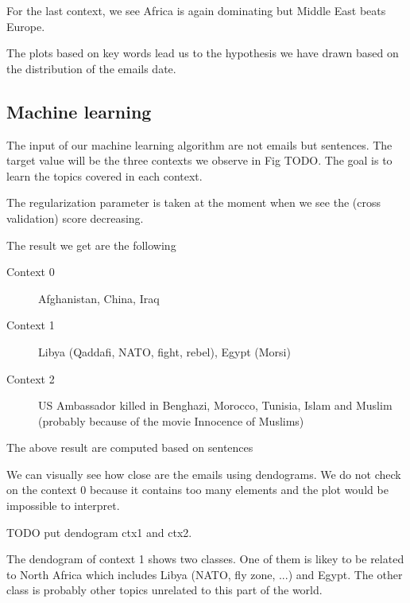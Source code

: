 \documentclass[11pt]{article}
\begin{document}
For the last context, we see Africa is again dominating but Middle East beats Europe.

The plots based on key words lead us to the hypothesis we have drawn based on the distribution of the emails date.

\subsection{Machine learning}

The input of our machine learning algorithm are not emails but sentences. The target value will be the three contexts we observe in Fig TODO. The goal is to learn the topics covered in each context.

The regularization parameter is taken at the moment when we see the (cross validation) score decreasing.

The result we get are the following

\begin{description}
    \item[Context 0] Afghanistan, China, Iraq
    \item[Context 1] Libya (Qaddafi, NATO, fight, rebel), Egypt (Morsi)
    \item[Context 2] US Ambassador killed in Benghazi, Morocco, Tunisia, Islam and Muslim (probably because of the movie Innocence of Muslims)
\end{description}

The above result are computed based on sentences

We can visually see how close are the emails using dendograms. We do not check on the context 0 because it contains too many elements and the plot would be impossible to interpret.

TODO put dendogram ctx1 and ctx2.

The dendogram of context 1 shows two classes. One of them is likey to be related to North Africa which includes Libya (NATO, fly zone, ...) and Egypt. The other class is probably other topics unrelated to this part of the world.
\end{document}
